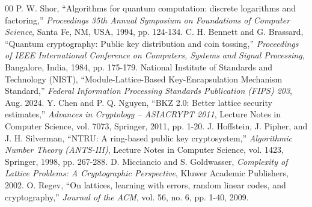 \documentclass[conference,a4paper]{IEEEtran}
\begin{document}
\begin{thebibliography}{00}
 P. W. Shor, ``Algorithms for quantum computation: discrete logarithms and factoring,'' \textit{Proceedings 35th Annual Symposium on Foundations of Computer Science}, Santa Fe, NM, USA, 1994, pp. 124-134.
 C. H. Bennett and G. Brassard, ``Quantum cryptography: Public key distribution and coin tossing,'' \textit{Proceedings of IEEE International Conference on Computers, Systems and Signal Processing}, Bangalore, India, 1984, pp. 175-179.
 National Institute of Standards and Technology (NIST), ``Module-Lattice-Based Key-Encapsulation Mechanism Standard,'' \textit{Federal Information Processing Standards Publication (FIPS) 203}, Aug. 2024.
 Y. Chen and P. Q. Nguyen, ``BKZ 2.0: Better lattice security estimates,'' \textit{Advances in Cryptology – ASIACRYPT 2011}, Lecture Notes in Computer Science, vol. 7073, Springer, 2011, pp. 1-20.
 J. Hoffstein, J. Pipher, and J. H. Silverman, ``NTRU: A ring-based public key cryptosystem,'' \textit{Algorithmic Number Theory (ANTS-III)}, Lecture Notes in Computer Science, vol. 1423, Springer, 1998, pp. 267-288.
 D. Micciancio and S. Goldwasser, \textit{Complexity of Lattice Problems: A Cryptographic Perspective}, Kluwer Academic Publishers, 2002.
 O. Regev, ``On lattices, learning with errors, random linear codes, and cryptography,'' \textit{Journal of the ACM}, vol. 56, no. 6, pp. 1-40, 2009.
\end{thebibliography}
\end{document}
